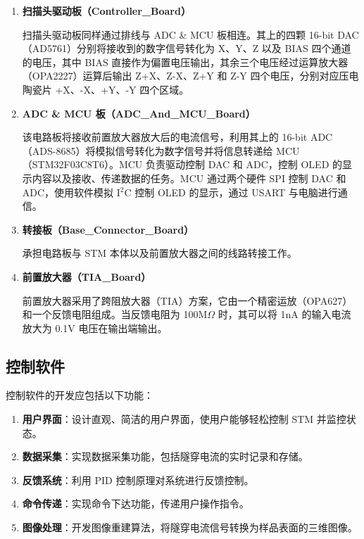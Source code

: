 \documentclass{article}
\begin{document}
\begin{spacing}{1.625}
\begin{enumerate}
		\item \textbf{扫描头驱动板（Controller\_Board）}\par
		\qquad 扫描头驱动板同样通过排线与 ADC \& MCU 板相连。其上的四颗 16-bit DAC（AD5761）分别将接收到的数字信号转化为 X、Y、Z 以及 BIAS 四个通道的电压，其中 BIAS 直接作为偏置电压输出，其余三个电压经过运算放大器（OPA2227）运算后输出 Z+X、Z-X、Z+Y 和 Z-Y 四个电压，分别对应压电陶瓷片 +X、-X、+Y、-Y 四个区域。
		
		\item \textbf{ADC \& MCU 板（ADC\_And\_MCU\_Board）}\par
		\qquad 该电路板将接收前置放大器放大后的电流信号，利用其上的 16-bit ADC（ADS-8685）将模拟信号转化为数字信号并将信息转递给 MCU（STM32F03C8T6）。MCU 负责驱动控制 DAC 和 ADC，控制 OLED 的显示内容以及接收、传递数据的任务。MCU 通过两个硬件 SPI 控制 DAC 和 ADC，使用软件模拟 I$^\text{2}$C 控制 OLED 的显示，通过 USART 与电脑进行通信。
		
		\item \textbf{转接板（Base\_Connector\_Board）}\par
		\qquad 承担电路板与 STM 本体以及前置放大器之间的线路转接工作。
		
		\item \textbf{前置放大器（TIA\_Board）}\par
		\qquad 前置放大器采用了跨阻放大器（TIA）方案，它由一个精密运放（OPA627）和一个反馈电阻组成。当反馈电阻为 100M$\Omega$ 时，其可以将 1nA 的输入电流放大为 0.1V 电压在输出端输出。
		
	\end{enumerate}
	
	
	
	
	
	
	\subsection{控制软件}
	控制软件的开发应包括以下功能：
	\begin{enumerate}
		\item \textbf{用户界面}：设计直观、简洁的用户界面，使用户能够轻松控制 STM 并监控状态。
		\item \textbf{数据采集}：实现数据采集功能，包括隧穿电流的实时记录和存储。
		\item \textbf{反馈系统}：利用 PID 控制原理对系统进行反馈控制。
		\item \textbf{命令传递}：实现命令下达功能，传递用户操作指令。
		\item \textbf{图像处理}：开发图像重建算法，将隧穿电流信号转换为样品表面的三维图像。
	\end{enumerate}
	

\end{spacing}
\end{document}
